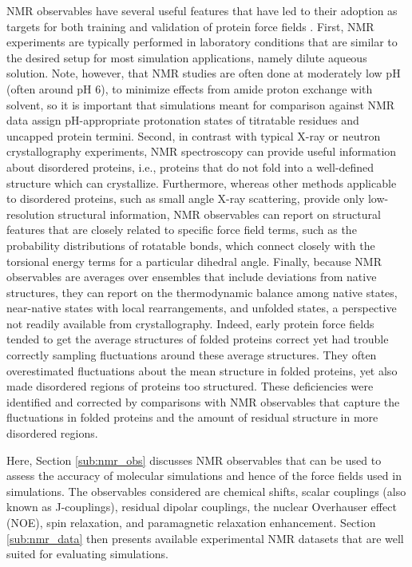 \documentclass[9pt,review]{livecoms}
\begin{document}
NMR observables have several useful features that have led to their adoption as targets for both training and validation of protein force fields \cite{allison_assessing_2012}.
First, NMR experiments are typically performed in laboratory conditions that are similar to the desired setup for most simulation applications, namely dilute aqueous solution.
Note, however, that NMR studies are often done at moderately low pH (often around pH 6), to minimize effects from amide proton exchange with solvent, so it is important that simulations meant for comparison against NMR data assign pH-appropriate protonation states of titratable residues and uncapped protein termini.
Second, in contrast with typical X-ray or neutron crystallography experiments, NMR spectroscopy can provide useful information about disordered proteins, i.e., proteins that do not fold into a well-defined structure which can crystallize.
Furthermore, whereas other methods applicable to disordered proteins, such as small angle X-ray scattering, provide only low-resolution structural information, NMR observables can report on structural features that are closely related to specific force field terms, such as the probability distributions of rotatable bonds, which connect closely with the torsional energy terms for a particular dihedral angle.
Finally, because NMR observables are averages over ensembles that include deviations from native structures, they can report on the thermodynamic balance among native states, near-native states with local rearrangements, and unfolded states, a perspective not readily available from crystallography.
Indeed, early protein force fields tended to get the average structures of folded proteins correct yet had trouble correctly sampling fluctuations around these average structures.
They often overestimated fluctuations about the mean structure in folded proteins, yet also made disordered regions of proteins too structured.
These deficiencies were identified and corrected by comparisons with NMR observables that capture the fluctuations in folded proteins and the amount of residual structure in more disordered regions.

Here, Section \ref{sub:nmr_obs} discusses NMR observables that can be used to assess the accuracy of molecular simulations and hence of the force fields used in simulations.
The observables considered are chemical shifts, scalar couplings (also known as J-couplings), residual dipolar couplings, the nuclear Overhauser effect (NOE), spin relaxation, and paramagnetic relaxation enhancement.
Section \ref{sub:nmr_data} then presents available experimental NMR datasets that are well suited for evaluating simulations.
\end{document}
